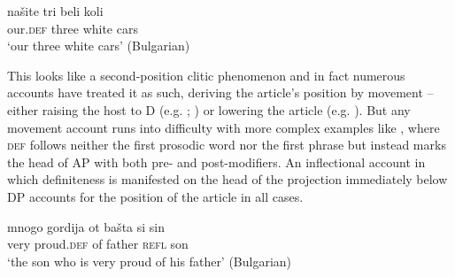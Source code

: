 \documentclass[output=paper,
colorlinks,
citecolor=brown,
newtxmath
]{langscibook}
\begin{document}
\ex
\gll našite tri beli koli\\
our.\textsc{def} three white cars\\
\glt `our three white cars’ \hfill(Bulgarian)
\z
\z

\noindent This looks like a second-position clitic phenomenon and in fact numerous accounts have treated it as such, deriving the article's position by movement – either raising the host to D (e.g. \citealt{Arnaudova1998}; \citealt{Tomic1996}) or lowering the article (e.g. \citealt{Embick.Noyer2001}). But any movement account runs into difficulty with more complex examples like , where \textsc{def} follows neither the first prosodic word nor the first phrase but instead marks the head of AP with both pre- and post-modifiers. An inflectional account in which definiteness is manifested on the head of the projection immediately below DP accounts for the position of the article in all cases.

\ea \label{proud}
\gll mnogo gordija ot bašta si sin\\
very proud.\textsc{def} of father \textsc{refl} son\\
\glt `the son who is very proud of his father’ \hfill(Bulgarian)
\z

    \largerpage[-1]
\end{document}
